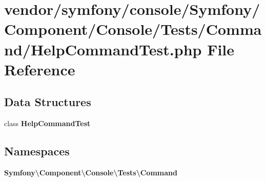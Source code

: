 \section{vendor/symfony/console/\+Symfony/\+Component/\+Console/\+Tests/\+Command/\+Help\+Command\+Test.php File Reference}
\label{_help_command_test_8php}
\subsection*{Data Structures}
\begin{DoxyCompactItemize}
\item 
class {\bf Help\+Command\+Test}
\end{DoxyCompactItemize}
\subsection*{Namespaces}
\begin{DoxyCompactItemize}
\item 
 {\bf Symfony\textbackslash{}\+Component\textbackslash{}\+Console\textbackslash{}\+Tests\textbackslash{}\+Command}
\end{DoxyCompactItemize}
